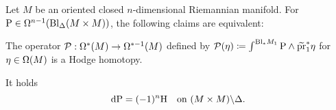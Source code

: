 \documentclass[\MainFolder/Text.tex]{subfiles}
\begin{document}
\begin{Proposition} \label{Prop:GKer}
Let $M$ be an oriented closed $n$-dimensional Riemannian manifold. For $\mathrm{P} \in \Omega^{n-1} (\mathrm{Bl}_\Delta(M\times M))$,  the following claims are equivalent:
\begin{PlainList} 
\item The operator $\mathcal{P}: \Omega^*(M) \rightarrow \Omega^{*-1}(M)$ defined by $\mathcal{P}(\eta) \coloneqq \int^{\mathrm{Bl}_* M_1} \mathrm{P} \wedge \widetilde{\operatorname{\mathrm{pr}}}_1^*\eta$ for $\eta\in \Omega(M)$ is a Hodge homotopy.
\item It holds \begin{equation} \label{Eq:GKer}
 \mathrm{d} \mathrm{P} = (-1)^{n} \mathrm{H}\quad\text{on }(M\times M)\backslash \Delta.
\end{equation} 
\end{PlainList}
\end{Proposition}
%
\end{document}
